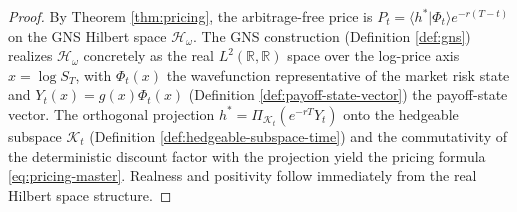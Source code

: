 \begin{proof}
By Theorem \ref{thm:pricing}, the arbitrage-free price is
$P_t = \langle h^* | \Phi_t \rangle e^{-r(T-t)}$ on the GNS Hilbert space
$\mathcal{H}_\omega$. The GNS construction (Definition \ref{def:gns}) realizes
$\mathcal{H}_\omega$ concretely as the real $L^2(\mathbb{R}, \mathbb{R})$ space
over the log-price axis $x = \log S_T$, with $\Phi_t(x)$ the wavefunction
representative of the market risk state and $Y_t(x) = g(x) \Phi_t(x)$
(Definition \ref{def:payoff-state-vector}) the payoff-state vector. The orthogonal
projection $h^* = \Pi_{\mathcal{K}_t}(e^{-rT} Y_t)$ onto the hedgeable subspace
$\mathcal{K}_t$ (Definition \ref{def:hedgeable-subspace-time}) and the
commutativity of the deterministic discount factor with the projection yield the
pricing formula \eqref{eq:pricing-master}. Realness and positivity follow
immediately from the real Hilbert space structure.
\end{proof}

